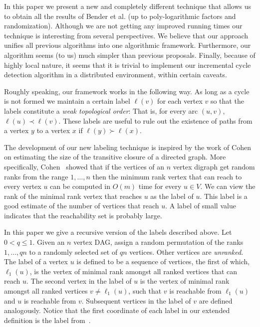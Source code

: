 \documentclass[11pt]{article}
\theoremstyle{plain}
\theoremstyle{definition}
\theoremstyle{remark}
\numberwithin{equation}{section}
\begin{document}
In this paper we present a new and completely different technique
that allows us to obtain all the results of Bender et al. (up to
poly-logarithmic factors and randomization). Although we are not
getting any improved running times our technique is interesting from
several perspectives. We believe that our approach unifies all
previous algorithms into one algorithmic framework. Furthermore, our
algorithm seems (to us) much simpler than previous proposals.
Finally, because of highly local nature, it seems that it is trivial
to implement our incremental cycle detection algorithm in a
distributed environment, within certain caveats.

Roughly speaking, our framework works in the following way. As long
as a cycle is not formed we maintain a certain label $\ell(v)$ for
each vertex $v$ so that the labels constitute  a {\em weak
topological order}: That is, for every arc $(u,v)$, $\ell(u) \prec
\ell(v)$. These labels are useful to rule out the existence of paths
from a vertex $y$ to a vertex $x$ if $\ell(y) \succ \ell(x)$.

The development of our new labeling technique is inspired by the
work of Cohen~\cite{Cohen:1997} on estimating the size of the
transitive closure of a directed graph. More specifically,
Cohen~\cite{Cohen:1997} showed that if the vertices of an $n$ vertex
digraph  get random ranks from the range $1,\ldots,n$ then the
minimum rank vertex that can reach to every vertex $u$ can be
computed in $O(m)$ time for every $u\in V$. We can view the rank of
the minimal rank vertex that reaches $u$ as the label of $u$.
This label is a good estimate of the number of vertices that reach
 $u$. A label of small value indicates that the reachability set
is probably large.

In this paper we give a recursive version of the labels described
above. Let $0 < q \leq 1$. Given an $n$ vertex DAG, assign a random
permutation of the ranks $1,\ldots,qn$ to a randomly selected set of
$qn$ vertices. Other vertices are {\sl unranked}. The label of a
vertex $u$ is defined to be a sequence of vertices, the first of
which, $\ell_1(u)$, is the vertex of minimal rank amongst all ranked
vertices that can reach $u$.  The second vertex in the label of $u$
is the vertex of minimal rank amongst all ranked vertices $v\neq
\ell_1(u)$, such that $v$ is reachable from $\ell_1(u)$ and $u$ is
reachable from $v$. Subsequent vertices in the label of $v$ are
defined analogously. Notice that the first coordinate of each label
in our extended definition is the label from~\cite{Cohen:1997}.
\end{document}
